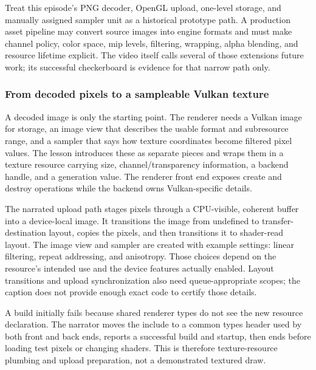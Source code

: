 Treat this episode's PNG decoder, OpenGL upload, one-level storage, and manually assigned sampler unit as a historical prototype path. A production asset pipeline may convert source images into engine formats and must make channel policy, color space, mip levels, filtering, wrapping, alpha blending, and resource lifetime explicit. The video itself calls several of those extensions future work; its successful checkerboard is evidence for that narrow path only.

\subsubsection{From decoded pixels to a sampleable Vulkan texture}\label{06-engine-ii-ch027-from-decoded-pixels-to-a-sampleable-vulkan-texture}

\hypertarget{06-engine-ii-ch027-from-decoded-pixels-to-a-sampleable-vulkan-texture}{}

A decoded image is only the starting point. The renderer needs a Vulkan image for storage, an image view that describes the usable format and subresource range, and a sampler that says how texture coordinates become filtered pixel values. The lesson introduces these as separate pieces and wraps them in a texture resource carrying size, channel/transparency information, a backend handle, and a generation value. The renderer front end exposes create and destroy operations while the backend owns Vulkan-specific details.

The narrated upload path stages pixels through a CPU-visible, coherent buffer into a device-local image. It transitions the image from undefined to transfer-destination layout, copies the pixels, and then transitions it to shader-read layout. The image view and sampler are created with example settings: linear filtering, repeat addressing, and anisotropy. Those choices depend on the resource's intended use and the device features actually enabled. Layout transitions and upload synchronization also need queue-appropriate scopes; the caption does not provide enough exact code to certify those details.

A build initially fails because shared renderer types do not see the new resource declaration. The narrator moves the include to a common types header used by both front and back ends, reports a successful build and startup, then ends before loading test pixels or changing shaders. This is therefore texture-resource plumbing and upload preparation, not a demonstrated textured draw.

